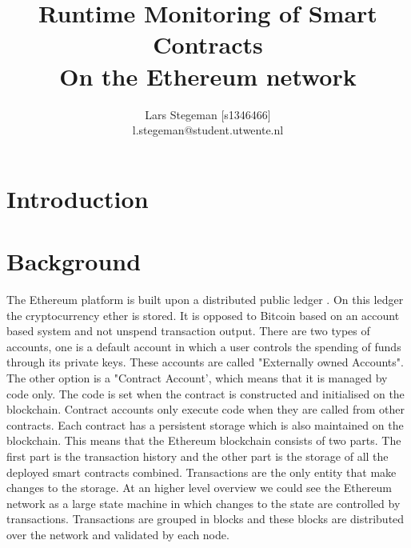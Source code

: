 \documentclass[a4paper]{article}
\title{Runtime Monitoring of Smart Contracts \\
\large On the Ethereum network \\}
\author{Lars Stegeman [s1346466]\\ l.stegeman@student.utwente.nl}
\begin{document}
\maketitle

\tableofcontents


\section{Introduction}

\section{Background}
The Ethereum platform is built upon a distributed public ledger . On this ledger the cryptocurrency ether is stored. It is opposed to Bitcoin based on an account based system and not unspend transaction output. There are two types of accounts, one is a default account in which a user controls the spending of funds through its private keys. These accounts are called "Externally owned Accounts". The other option is a "Contract Account', which means that it is managed by code only. The code is set when the contract is constructed and initialised on the blockchain. Contract accounts only execute code when they are called from other contracts. Each contract has a persistent storage which is also maintained on the blockchain. This means that the Ethereum blockchain consists of two parts. The first part is the transaction history and the other part is the storage of all the deployed smart contracts combined. Transactions are the only entity that make changes to the storage. At an higher level overview we could see the Ethereum network as a large state machine in which changes to the state are controlled by transactions. Transactions are grouped in blocks and these blocks are distributed over the network and validated by each node. 
\end{document}
